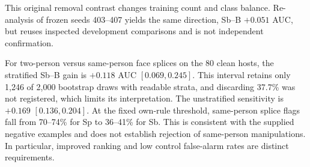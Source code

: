     This original removal contrast changes training count and class balance. Re-analysis of frozen seeds 403--407 yields the same direction, Sb--B $+0.051$ AUC, but reuses inspected development comparisons and is not independent confirmation.
    
    For two-person versus same-person face splices on the 80 clean hosts, the stratified Sb--B gain is $+0.118$ AUC $[0.069,0.245]$. This interval retains only 1,246 of 2,000 bootstrap draws with readable strata, and discarding 37.7\% was not registered, which limits its interpretation. The unstratified sensitivity is $+0.169$ $[0.136,0.204]$. At the fixed own-rule threshold, same-person splice flags fall from 70--74\% for Sp to 36--41\% for Sb. This is consistent with the supplied negative examples and does not establish rejection of same-person manipulations. In particular, improved ranking and low control false-alarm rates are distinct requirements.
    
